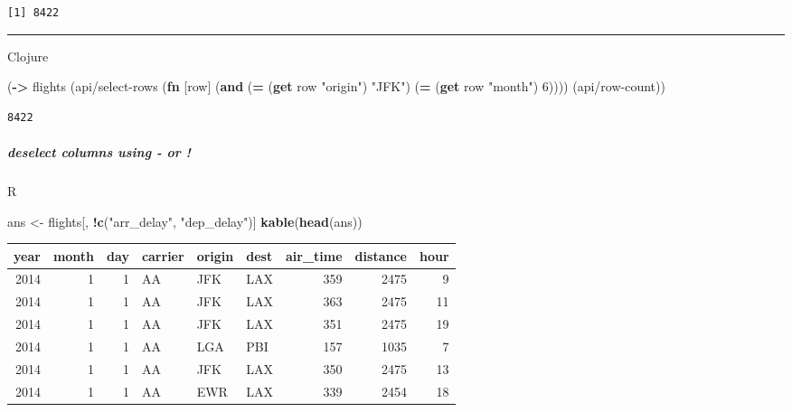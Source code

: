 \documentclass[]{article}
\newenvironment{Shaded}{\begin{snugshade}}{\end{snugshade}}
\newcommand{\KeywordTok}[1]{\textcolor[rgb]{0.13,0.29,0.53}{\textbf{#1}}}
\newcommand{\DecValTok}[1]{\textcolor[rgb]{0.00,0.00,0.81}{#1}}
\newcommand{\StringTok}[1]{\textcolor[rgb]{0.31,0.60,0.02}{#1}}
\newcommand{\OperatorTok}[1]{\textcolor[rgb]{0.81,0.36,0.00}{\textbf{#1}}}
\newcommand{\NormalTok}[1]{#1}
\let\oldsubparagraph\subparagraph
\renewcommand{\subparagraph}[1]{\oldsubparagraph{#1}\mbox{}}
\begin{document}
\begin{verbatim}
[1] 8422
\end{verbatim}

\begin{center}\rule{0.5\linewidth}{0.5pt}\end{center}

Clojure

\begin{Shaded}
\begin{Highlighting}[]
\NormalTok{(}\KeywordTok{->}\NormalTok{ flights}
\NormalTok{    (api/select-rows (}\KeywordTok{fn}\NormalTok{ [row] (}\KeywordTok{and}\NormalTok{ (}\KeywordTok{=}\NormalTok{ (}\KeywordTok{get}\NormalTok{ row }\StringTok{"origin"}\NormalTok{) }\StringTok{"JFK"}\NormalTok{)}
\NormalTok{                                   (}\KeywordTok{=}\NormalTok{ (}\KeywordTok{get}\NormalTok{ row }\StringTok{"month"}\NormalTok{) }\DecValTok{6}\NormalTok{))))}
\NormalTok{    (api/row-count))}
\end{Highlighting}
\end{Shaded}

\begin{verbatim}
8422
\end{verbatim}

\subparagraph{deselect columns using - or
!}\label{deselect-columns-using---or}

R

\begin{Shaded}
\begin{Highlighting}[]
\NormalTok{ans <-}\StringTok{ }\NormalTok{flights[, }\OperatorTok{!}\KeywordTok{c}\NormalTok{(}\StringTok{"arr_delay"}\NormalTok{, }\StringTok{"dep_delay"}\NormalTok{)]}
\KeywordTok{kable}\NormalTok{(}\KeywordTok{head}\NormalTok{(ans))}
\end{Highlighting}
\end{Shaded}

\begin{longtable}[]{@{}rrrlllrrr@{}}
\toprule
year & month & day & carrier & origin & dest & air\_time & distance &
hour\tabularnewline
\midrule
\endhead
2014 & 1 & 1 & AA & JFK & LAX & 359 & 2475 & 9\tabularnewline
2014 & 1 & 1 & AA & JFK & LAX & 363 & 2475 & 11\tabularnewline
2014 & 1 & 1 & AA & JFK & LAX & 351 & 2475 & 19\tabularnewline
2014 & 1 & 1 & AA & LGA & PBI & 157 & 1035 & 7\tabularnewline
2014 & 1 & 1 & AA & JFK & LAX & 350 & 2475 & 13\tabularnewline
2014 & 1 & 1 & AA & EWR & LAX & 339 & 2454 & 18\tabularnewline
\bottomrule
\end{longtable}
\end{document}
